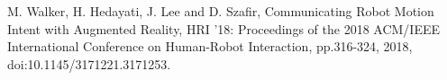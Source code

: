 \documentclass[a4paper,10pt,twocolumn,uplatex]{jsarticle}
\begin{document}


\footnotesize{
  \begin{thebibliography}{99}
     M. Walker, H. Hedayati, J. Lee and D. Szafir, Communicating Robot Motion Intent with Augmented
    Reality, HRI ’18: Proceedings of the 2018 ACM/IEEE International Conference on Human-Robot
    Interaction, pp.316-324, 2018, doi:10.1145/3171221.3171253.
  \end{thebibliography}
}

\end{document}
